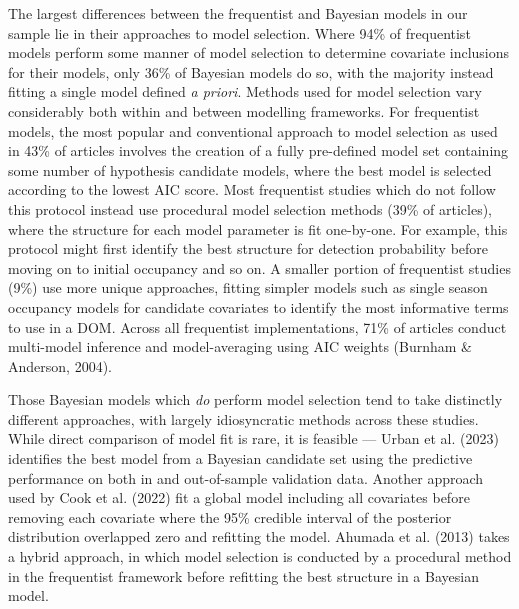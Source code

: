 \documentclass[
]{article}
\begin{document}
The largest differences between the frequentist and Bayesian models in
our sample lie in their approaches to model selection. Where 94\% of
frequentist models perform some manner of model selection to determine
covariate inclusions for their models, only 36\% of Bayesian models do
so, with the majority instead fitting a single model defined \emph{a
priori}. Methods used for model selection vary considerably both within
and between modelling frameworks. For frequentist models, the most
popular and conventional approach to model selection as used in 43\% of
articles involves the creation of a fully pre-defined model set
containing some number of hypothesis candidate models, where the best
model is selected according to the lowest AIC score. Most frequentist
studies which do not follow this protocol instead use procedural model
selection methods (39\% of articles), where the structure for each model
parameter is fit one-by-one. For example, this protocol might first
identify the best structure for detection probability before moving on
to initial occupancy and so on. A smaller portion of frequentist studies
(9\%) use more unique approaches, fitting simpler models such as single
season occupancy models for candidate covariates to identify the most
informative terms to use in a DOM. Across all frequentist
implementations, 71\% of articles conduct multi-model inference and
model-averaging using AIC weights (Burnham \& Anderson, 2004).

Those Bayesian models which \emph{do} perform model selection tend to
take distinctly different approaches, with largely idiosyncratic methods
across these studies. While direct comparison of model fit is rare, it
is feasible --- Urban et al. (2023) identifies the best model from a
Bayesian candidate set using the predictive performance on both in and
out-of-sample validation data. Another approach used by Cook et al.
(2022) fit a global model including all covariates before removing each
covariate where the 95\% credible interval of the posterior distribution
overlapped zero and refitting the model. Ahumada et al. (2013) takes a
hybrid approach, in which model selection is conducted by a procedural
method in the frequentist framework before refitting the best structure
in a Bayesian model.
\end{document}
